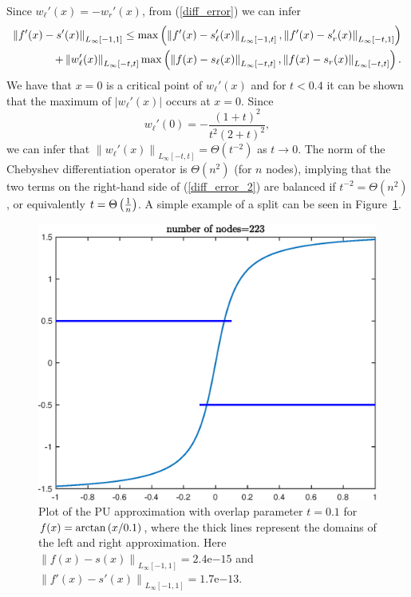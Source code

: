 Since $w_{\ell}'(x)=-w_{r}'(x)$, from (\ref{diff_error}) we can infer
\begin{equation}
\begin{aligned}
\left \| f'(x)-s'(x) \right \|_{L_{\infty}[-1,1]} \leq \max \left( \left \| f'(x)-s_{\ell}'(x) \right \|_{L_{\infty}[-1,t]} , \left \| f'(x)-s_{r}'(x) \right \|_{L_{\infty}[-t,1]} \right)& \\
+\left \| w_{\ell}'(x) \right \|_{L_{\infty}[-t,t]} \max \left( \left \| f(x)-s_{\ell}(x)\right \|_{L_{\infty}[-t,t]}
, \left \| f(x)-s_{r}(x)\right \|_{L_{\infty}[-t,t]} \right). &
\end{aligned}
\label{diff_error_2}
\end{equation}
We have that $x=0$ is a critical point of $w_{\ell}'(x)$ and for $t<0.4$ it can be shown that the maximum of $\left |w_{\ell}'(x) \right |$ occurs at $x=0$. Since
\begin{equation}
w_{\ell}'(0) = -\frac{(1+t)^2}{t^2 (2+t)^2},
\end{equation}
we can infer that $\left \| w_{\ell}'(x) \right \|_{L_{\infty}[-t,t]} = \Theta(t^{-2})$ as $t\to 0$. The norm of the Chebyshev differentiation operator is $\Theta(n^2)$ (for $n$ nodes), implying that the two terms on the right-hand side of (\ref{diff_error_2}) are balanced if $t^{-2}=\Theta(n^2)$, or equivalently $t = \Theta \left( \frac{1}{n} \right)$. A simple example of a split can be seen in Figure~\ref{ARCTAN}.

 
\begin{figure}[!htb]
\centering
\includegraphics[scale = 0.5]{Chapter1/PUTANEXAMP.eps}
\caption{Plot of the PU approximation with overlap parameter $t=0.1$ for $f(x)=\arctan \left( x/0.1 \right)$, where the thick lines represent the domains of the left and right approximation. Here $\left \| f(x)-s(x) \right \|_{L_{\infty}[-1,1]}= 2.4 \mathrm{e}{-15}$ and $\left \| f'(x)-s'(x) \right \|_{L_{\infty}[-1,1]}= 1.7 \mathrm{e}{-13}$.}
\label{ARCTAN}
\end{figure}

